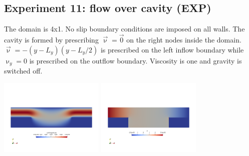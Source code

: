 \newpage
\subsection*{Experiment 11: flow over cavity (EXP)}

The domain is 4x1. No slip boundary conditions are imposed on all walls.
The cavity is formed by prescribing $\vec{\upnu}=\vec{0}$ on the right
nodes inside the domain. $\vec{\upnu}=-(y-L_y)(y-L_y/2)$ is prescribed 
on the left inflow boundary while $\upnu_y=0$ is prescribed on the outflow boundary.
Viscosity is one and gravity is switched off.
 
\begin{center}
\includegraphics[width=5cm]{python_codes/fieldstone_78/results/exp11/vel}
\includegraphics[width=5cm]{python_codes/fieldstone_78/results/exp11/p}
\end{center}

